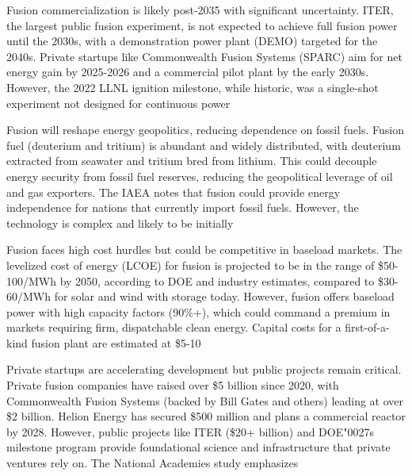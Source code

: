 \documentclass[10pt,a4paper]{article}
\newcommand{\BOApos}{{\BOQuoteFont\char"0027}}
\begin{document}
\begin{minipage}[t]{0.46\linewidth}
{\small Fusion commercialization is likely post-2035 with significant uncertainty. ITER, the largest public fusion experiment, is not expected to achieve full fusion power until the 2030s, with a demonstration power plant (DEMO) targeted for the 2040s. Private startups like Commonwealth Fusion Systems (SPARC) aim for net energy gain by 2025-2026 and a commercial pilot plant by the early 2030s. However, the 2022 LLNL ignition milestone, while historic, was a single-shot experiment not designed for continuous power}\par
{\small Fusion will reshape energy geopolitics, reducing dependence on fossil fuels. Fusion fuel (deuterium and tritium) is abundant and widely distributed, with deuterium extracted from seawater and tritium bred from lithium. This could decouple energy security from fossil fuel reserves, reducing the geopolitical leverage of oil and gas exporters. The IAEA notes that fusion could provide energy independence for nations that currently import fossil fuels. However, the technology is complex and likely to be initially}\par
\end{minipage}\hfill\begin{minipage}[t]{0.46\linewidth}
{\small Fusion faces high cost hurdles but could be competitive in baseload markets. The levelized cost of energy (LCOE) for fusion is projected to be in the range of \$50-100/MWh by 2050, according to DOE and industry estimates, compared to \$30-60/MWh for solar and wind with storage today. However, fusion offers baseload power with high capacity factors (90\%+), which could command a premium in markets requiring firm, dispatchable clean energy. Capital costs for a first-of-a-kind fusion plant are estimated at \$5-10}\par
{\small Private startups are accelerating development but public projects remain critical. Private fusion companies have raised over \$5 billion since 2020, with Commonwealth Fusion Systems (backed by Bill Gates and others) leading at over \$2 billion. Helion Energy has secured \$500 million and plans a commercial reactor by 2028. However, public projects like ITER (\$20+ billion) and DOE\BOApos{}s milestone program provide foundational science and infrastructure that private ventures rely on. The National Academies study emphasizes}\par
\end{minipage}
\end{document}
